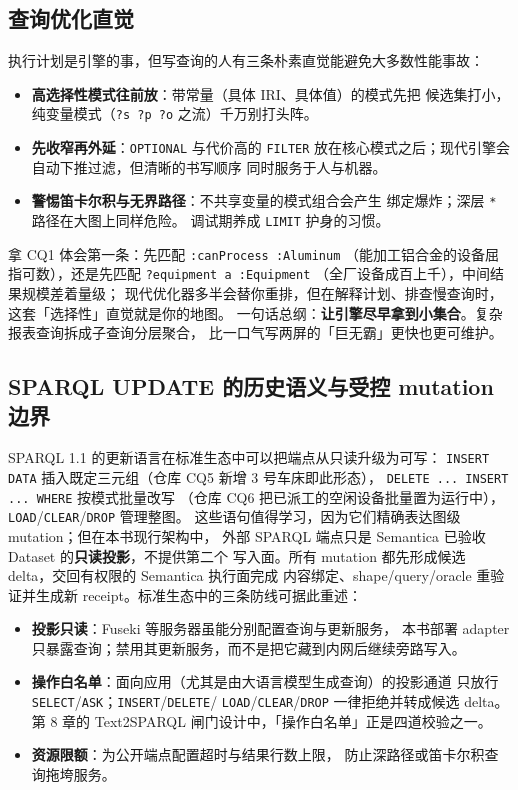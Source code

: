 \subsection{查询优化直觉}

执行计划是引擎的事，但写查询的人有三条朴素直觉能避免大多数性能事故：

\begin{itemize}
  \item \textbf{高选择性模式往前放}：带常量（具体 IRI、具体值）的模式先把
        候选集打小，纯变量模式（\texttt{?s ?p ?o} 之流）千万别打头阵。
  \item \textbf{先收窄再外延}：\texttt{OPTIONAL} 与代价高的 \texttt{FILTER}
        放在核心模式之后；现代引擎会自动下推过滤，但清晰的书写顺序
        同时服务于人与机器。
  \item \textbf{警惕笛卡尔积与无界路径}：不共享变量的模式组合会产生
        绑定爆炸；深层 \texttt{*} 路径在大图上同样危险。
        调试期养成 \texttt{LIMIT} 护身的习惯。
\end{itemize}

拿 CQ1 体会第一条：先匹配 \texttt{:canProcess :Aluminum}
（能加工铝合金的设备屈指可数），还是先匹配 \texttt{?equipment a :Equipment}
（全厂设备成百上千），中间结果规模差着量级；
现代优化器多半会替你重排，但在解释计划、排查慢查询时，
这套「选择性」直觉就是你的地图。
一句话总纲：\textbf{让引擎尽早拿到小集合}。复杂报表查询拆成子查询分层聚合，
比一口气写两屏的「巨无霸」更快也更可维护。

\subsection{SPARQL UPDATE 的历史语义与受控 mutation 边界}

SPARQL 1.1 的更新语言在标准生态中可以把端点从只读升级为可写：
\texttt{INSERT DATA} 插入既定三元组（仓库 CQ5 新增 3 号车床即此形态），
\texttt{DELETE ... INSERT ... WHERE} 按模式批量改写
（仓库 CQ6 把已派工的空闲设备批量置为运行中），
\texttt{LOAD}/\texttt{CLEAR}/\texttt{DROP} 管理整图。
这些语句值得学习，因为它们精确表达图级 mutation；但在本书现行架构中，
外部 SPARQL 端点只是 Semantica 已验收 Dataset 的\textbf{只读投影}，不提供第二个
写入面。所有 mutation 都先形成候选 delta，交回有权限的 Semantica 执行面完成
内容绑定、shape/query/oracle 重验证并生成新 receipt。标准生态中的三条防线可据此重述：

\begin{itemize}
  \item \textbf{投影只读}：Fuseki 等服务器虽能分别配置查询与更新服务，
        本书部署 adapter 只暴露查询；禁用其更新服务，而不是把它藏到内网后继续旁路写入。
  \item \textbf{操作白名单}：面向应用（尤其是由大语言模型生成查询）的投影通道
        只放行 \texttt{SELECT}/\texttt{ASK}；\texttt{INSERT}/\texttt{DELETE}/
        \texttt{LOAD}/\texttt{CLEAR}/\texttt{DROP} 一律拒绝并转成候选 delta。
        第 8 章的 Text2SPARQL 闸门设计中，「操作白名单」正是四道校验之一。
  \item \textbf{资源限额}：为公开端点配置超时与结果行数上限，
        防止深路径或笛卡尔积查询拖垮服务。
\end{itemize}

